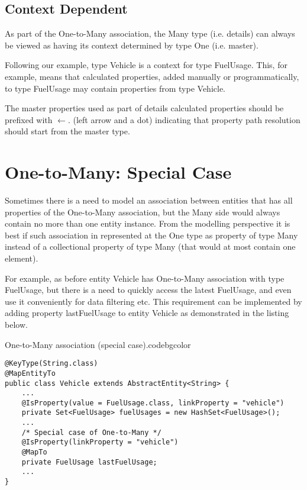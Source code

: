   \subsection{Context Dependent}

  As part of the One-to-Many association, the Many type (i.e. details) can always be viewed as having its context determined by type One (i.e. master).

  Following our example, type Vehicle is a context for type FuelUsage. This, for example, means that calculated properties, added manually or programmatically, to type FuelUsage may contain properties from type Vehicle.

  The master properties used as part of details calculated properties should be prefixed with $\leftarrow.$ (left arrow and a dot) indicating that property path resolution should start from the master type.

\section{One-to-Many: Special Case}

  Sometimes there is a need to model an association between entities that has all properties of the One-to-Many association, but the Many side would always contain no more than one entity instance. From the modelling perspective it is best if such association in represented at the One type as property of type Many instead of a collectional property of type Many (that would at most contain one element).

  For example, as before entity Vehicle has One-to-Many association with type FuelUsage, but there is a need to quickly access the latest FuelUsage, and even use it conveniently for data filtering etc. This requirement can be implemented by adding property lastFuelUsage to entity Vehicle as demonstrated in the listing below.

  \begin{code}{One-to-Many association (special case).}{\label{lst:One2ManySpecialCase}}{codebgcolor}
    \begin{lstlisting}
@KeyType(String.class)
@MapEntityTo
public class Vehicle extends AbstractEntity<String> {
    ...
    @IsProperty(value = FuelUsage.class, linkProperty = "vehicle") 
    private Set<FuelUsage> fuelUsages = new HashSet<FuelUsage>();   
    ...
    /* Special case of One-to-Many */
    @IsProperty(linkProperty = "vehicle")
    @MapTo
    private FuelUsage lastFuelUsage;   
    ...
} 
    \end{lstlisting}
  \end{code}

